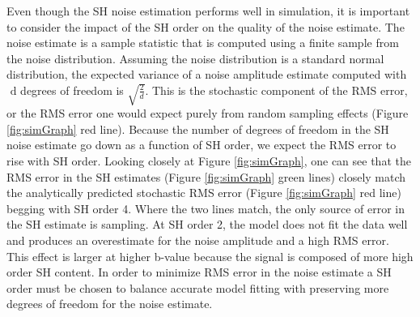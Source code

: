 Even though the SH noise estimation performs well in simulation, it is
important to consider the impact of the SH order on the quality of the
noise estimate. The noise estimate is a sample statistic that is
computed using a finite sample from the noise distribution. Assuming the
noise distribution is a standard normal distribution, the expected
variance of a noise amplitude estimate computed with\(\text{\ d}\)
degrees of freedom is \(\sqrt{\frac{2}{d}}\). This is the stochastic
component of the RMS error, or the RMS error one would expect purely
from random sampling effects (Figure \ref{fig:simGraph} red line). Because the number of
degrees of freedom in the SH noise estimate go down as a function of SH
order, we expect the RMS error to rise with SH order. Looking closely at
Figure \ref{fig:simGraph}, one can see that the RMS error in the SH estimates (Figure \ref{fig:simGraph}
green lines) closely match the analytically predicted stochastic RMS
error (Figure \ref{fig:simGraph} red line) begging with SH order 4. Where the two lines
match, the only source of error in the SH estimate is sampling. At SH
order 2, the model does not fit the data well and produces an
overestimate for the noise amplitude and a high RMS error. This effect
is larger at higher b-value because the signal is composed of more high
order SH content. In order to minimize RMS error in the noise estimate a
SH order must be chosen to balance accurate model fitting with
preserving more degrees of freedom for the noise estimate.
